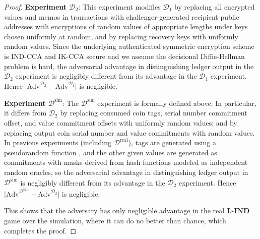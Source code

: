 \documentclass{llncs}
\begin{document}
\begin{proof}
\textbf{Experiment $\mathcal{D}_2$}: This experiment modifies $\mathcal{D}_{1}$ by replacing all encrypted values and memos in transactions with challenger-generated recipient public addresses with encryptions of random values of appropriate lengths under keys chosen uniformly at random, and by replacing recovery keys with uniformly random values.
Since the underlying authenticated symmetric encryption scheme is IND-CCA and IK-CCA secure and we assume the decisional Diffie-Hellman problem is hard, the adversarial advantage in distinguishing ledger output in the $\mathcal{D}_2$ experiment is negligibly different from its advantage in the $\mathcal{D}_{1}$ experiment.
Hence $\lvert \text{Adv}^{\mathcal{D}_2} - \text{Adv}^{\mathcal{D}_1} \rvert$ is negligible.

\textbf{Experiment $\mathcal{D}^{\text{sim}}$}: The $\mathcal{D}^{\text{sim}}$ experiment is formally defined above.
In particular, it differs from $\mathcal{D}_{2}$ by replacing consumed coin tags, serial number commitment offset, and value commitment offsets with uniformly random values; and by replacing output coin serial number and value commitments with random values.
In previous experiments (including $\mathcal{D}^{\text{real}}$), tags are generated using a pseudorandom function \cite{dodis}, and the other given values are generated as commitments with masks derived from hash functions modeled as independent random oracles, so the adversarial advantage in distinguishing ledger output in $\mathcal{D}^{\text{sim}}$ is negligibly different from its advantage in the $\mathcal{D}_2$ experiment.
Hence $\lvert \text{Adv}^{\mathcal{D}^{\text{sim}}} - \text{Adv}^{\mathcal{D}_2} \rvert$ is negligible.

This shows that the adversary has only negligible advantage in the real $\textbf{L-IND}$ game over the simulation, where it can do no better than chance, which completes the proof.
\end{proof}
\end{document}
